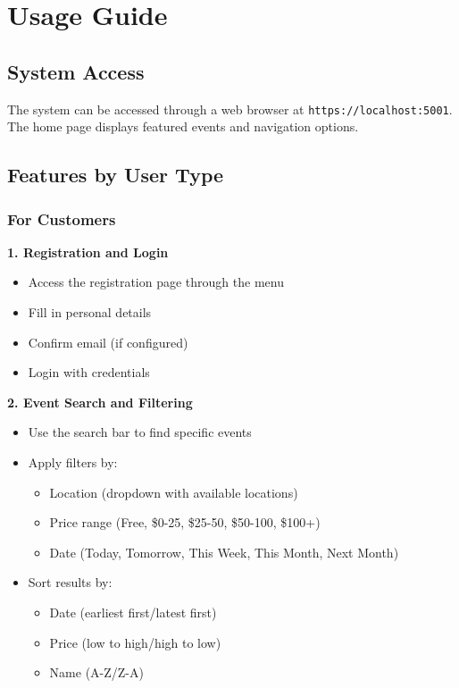 \documentclass[12pt,a4paper]{article}
\begin{document}
\section{Usage Guide}

\subsection{System Access}

The system can be accessed through a web browser at \texttt{https://localhost:5001}. The home page displays featured events and navigation options.

\subsection{Features by User Type}

\subsubsection{For Customers}

\textbf{1. Registration and Login}
\begin{itemize}
    \item Access the registration page through the menu
    \item Fill in personal details
    \item Confirm email (if configured)
    \item Login with credentials
\end{itemize}

\textbf{2. Event Search and Filtering}
\begin{itemize}
    \item Use the search bar to find specific events
    \item Apply filters by:
    \begin{itemize}
        \item Location (dropdown with available locations)
        \item Price range (Free, \$0-25, \$25-50, \$50-100, \$100+)
        \item Date (Today, Tomorrow, This Week, This Month, Next Month)
    \end{itemize}
    \item Sort results by:
    \begin{itemize}
        \item Date (earliest first/latest first)
        \item Price (low to high/high to low)
        \item Name (A-Z/Z-A)
    \end{itemize}
\end{itemize}
\end{document}

